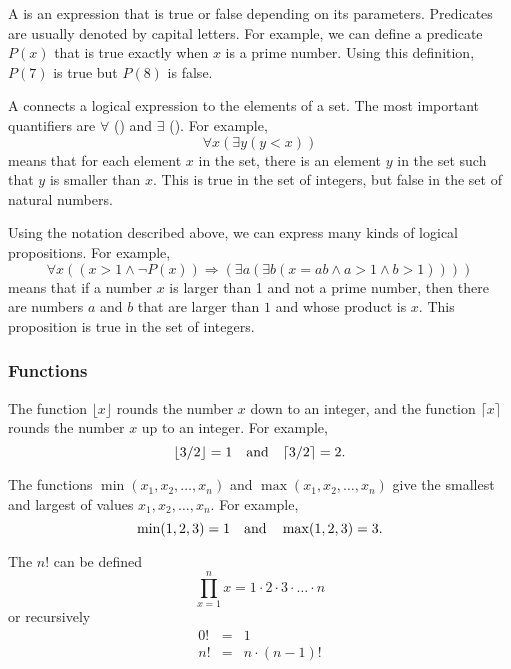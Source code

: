 
A  is an expression that is true or false
depending on its parameters.
Predicates are usually denoted by capital letters.
For example, we can define a predicate $P(x)$
that is true exactly when $x$ is a prime number.
Using this definition, $P(7)$ is true but $P(8)$ is false.


A  connects a logical expression
to the elements of a set.
The most important quantifiers are
$\forall$ () and $\exists$ ().
For example,
\[\forall x (\exists y (y < x))\]
means that for each element $x$ in the set,
there is an element $y$ in the set
such that $y$ is smaller than $x$.
This is true in the set of integers,
but false in the set of natural numbers.

Using the notation described above,
we can express many kinds of logical propositions.
For example,
\[\forall x ((x>1 \land \lnot P(x)) \Rightarrow (\exists a (\exists b (x = ab \land a > 1 \land b > 1))))\]
means that if a number $x$ is larger than 1
and not a prime number,
then there are numbers $a$ and $b$
that are larger than $1$ and whose product is $x$.
This proposition is true in the set of integers.

\subsubsection{Functions}

The function $\lfloor x \rfloor$ rounds the number $x$
down to an integer, and the function
$\lceil x \rceil$ rounds the number $x$
up to an integer. For example,
\[ \lfloor 3/2 \rfloor = 1 \hspace{10px} \textrm{and} \hspace{10px} \lceil 3/2 \rceil = 2.\]

The functions $\min(x_1,x_2,\ldots,x_n)$
and $\max(x_1,x_2,\ldots,x_n)$
give the smallest and largest of values
$x_1,x_2,\ldots,x_n$.
For example,
\[ \min(1,2,3)=1 \hspace{10px} \textrm{and} \hspace{10px} \max(1,2,3)=3.\]


The  $n!$ can be defined
\[\prod_{x=1}^n x = 1 \cdot 2 \cdot 3 \cdot \ldots \cdot n\]
or recursively
\[
\begin{array}{lcl}
0! & = & 1 \\
n! & = & n \cdot (n-1)! \\
\end{array}
\]

